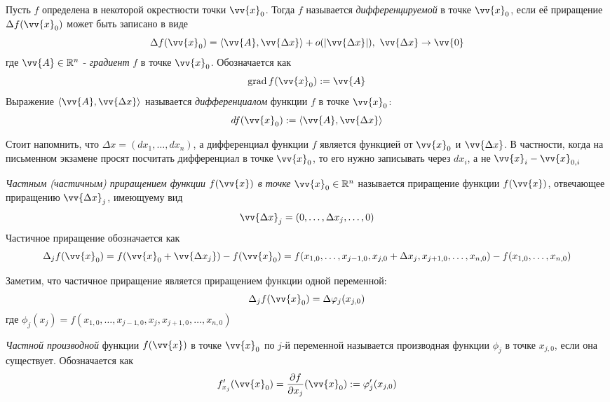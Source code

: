 \begin{definition}
	Пусть $f$ определена в некоторой окрестности точки $\vv{x}_0$. Тогда $f$ называется \textit{дифференцируемой} в точке $\vv{x}_0$, если её приращение $\Delta f(\vv{x}_0)$ может быть записано в виде
	\[
		\Delta f(\vv{x}_0) = \trbr{\vv{A}, \vv{\Delta x}} + o(|\vv{\Delta x}|),\ \vv{\Delta x} \to \vv{0}
	\]
	где $\vv{A} \in \R^n$ - \textit{градиент} $f$ в точке $\vv{x}_0$. Обозначается как
	\[
		\grad f(\vv{x}_0) := \vv{A}
	\]
	Выражение $\trbr{\vv{A}, \vv{\Delta x}}$ называется \textit{дифференциалом} функции $f$ в точке $\vv{x}_0$:
	\[
		df(\vv{x}_0) := \trbr{\vv{A}, \vv{\Delta x}}
	\]
\end{definition}

\begin{anote}
	Стоит напомнить, что $\Delta x = (dx_1, \ldots, dx_n)$, а дифференциал функции $f$ является функцией от $\vv{x}_0$ и $\vv{\Delta x}$. В частности, когда на письменном экзамене просят посчитать дифференциал в точке $\vv{x}_0$, то его нужно записывать через $dx_i$, а не $\vv{x}_i - \vv{x}_{0, i}$
\end{anote}

\begin{definition}
	\textit{Частным (частичным) приращением функции $f(\vv{x})$ в точке} $\vv{x}_0 \in \R^n$ называется приращение функции $f(\vv{x})$, отвечающее 	приращению $\vv{\Delta x}_j$, имеющуему вид
	\[
		\vv{\Delta x}_j = (0, \ldots, \Delta x_j, \ldots, 0)
	\]
	Частичное приращение обозначается как
	\[
		\Delta_j f(\vv{x}_0) = f(\vv{x}_0 + \vv{\Delta x_j}) - f(\vv{x}_0) = f(x_{1, 0}, \ldots, x_{j - 1, 0}, x_{j, 0} + \Delta x_j, x_{j + 1, 0}, \ldots, x_{n, 0}) - f(x_{1, 0}, \ldots, x_{n, 0})
	\]
\end{definition}

\begin{note}
	Заметим, что частичное приращение является приращением функции одной переменной:
	\[
		\Delta_j f(\vv{x}_0) = \Delta \phi_j (x_{j, 0})
	\]
	где $\phi_j(x_j) = f(x_{1, 0}, \ldots, x_{j - 1, 0}, x_j, x_{j + 1, 0}, \ldots, x_{n, 0})$
\end{note}

\begin{definition}
	\textit{Частной производной} функции $f(\vv{x})$ в точке $\vv{x}_0$ по $j$-й переменной называется производная функции $\phi_j$ в точке $x_{j, 0}$, если она существует. Обозначается как 
	\[
		f'_{x_j}(\vv{x}_0) = \pd{f}{x_j} (\vv{x}_0) := \phi'_j (x_{j, 0})
	\]
\end{definition}

